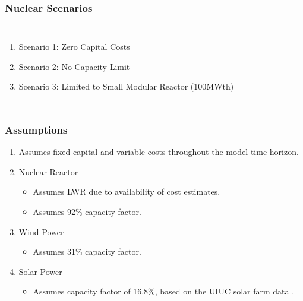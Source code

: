 \begin{frame}
  \frametitle{Nuclear Scenarios}
  \begin{columns}
    \column[t]{3cm}
    \begin{enumerate}
      \item Scenario 1: Zero Capital Costs
      \item Scenario 2: No Capacity Limit
      \item Scenario 3: Limited to Small Modular Reactor (100MWth)
    \end{enumerate}

    \column[t]{7cm}
    \begin{table}
      \centering
      \caption{Summary of Nuclear Scenarios. Costs from EIA and NEI reports \cite{desai_nuclear_2018}\cite{us_department_of_energy_capital_2016}. Assumes
      thermal efficiency of 33\%.}
      \label{table:scenarios}
    \end{table}
  \end{columns}
\end{frame}

\begin{frame}
  \frametitle{Assumptions}
  \begin{enumerate}
    \item Assumes fixed capital and variable costs throughout the model time horizon.
    \item Nuclear Reactor
    \begin{itemize}
      \item Assumes LWR due to availability of cost estimates.
      \item Assumes 92\% capacity factor.
    \end{itemize}
    \item Wind Power
    \begin{itemize}
      \item Assumes 31\% capacity factor.
    \end{itemize}
    \item Solar Power
    \begin{itemize}
      \item Assumes capacity factor of 16.8\%, based on the UIUC solar farm data \cite{alsoenergy_university_2019}.
    \end{itemize}
  \end{enumerate}
\end{frame}

